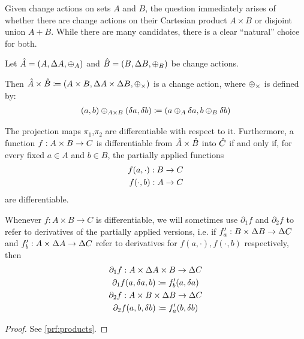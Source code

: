 Given change actions on sets $A$ and $B$, the question immediately arises of whether there are
change actions on their Cartesian product $A \times B$ or disjoint union $A + B$. While there are
many candidates, there is a clear ``natural'' choice for both.

\begin{prop}[name=Products, restate=products]
  \label{prop:products}
  Let $\hat{A} = (A,\Delta A,\oplus_A)$ and $\hat{B} =
  (B,\Delta B,\oplus_B)$ be change actions.

  Then $\hat{A} \times \hat{B} \coloneqq (A \times B,\Delta A \times \Delta B,\oplus_{\times})$ is a change action,
  where $\oplus_{\times}$ is defined by:
  \begin{align*}
    (a, b) \oplus_{A \times B} (\delta a, \delta b) \coloneqq (a \oplus_A \delta a, b \oplus_B \delta b)
  \end{align*}
  
  The projection maps $\pi_1$,$\pi_2$ are differentiable with respect to it.
  Furthermore, a function 
  $f : A \times B \rightarrow C$ is differentiable from $\hat{A} \times \hat{B}$ into $\hat{C}$ if
  and only if, for every fixed $a \in A$ and $b \in B$, the partially applied functions 
  \begin{align*}
    f(a, \cdot) : B \rightarrow C\\
    f(\cdot, b) : A \rightarrow C
  \end{align*}
  are differentiable.
\end{prop}

Whenever $f : A \times B \rightarrow C$ is differentiable, we will sometimes use $\partial_1 f$ and
$\partial_2 f$ to refer to derivatives of the partially applied versions, i.e. if
$f'_a : B \times \Delta B \rightarrow \Delta C$ and
$f'_b : A \times \Delta A \rightarrow \Delta C$ refer to derivatives for 
$f(a, \cdot), f(\cdot, b)$ respectively, then
\begin{gather*}
  \partial_1 f : A \times \Delta A \times B \rightarrow \Delta C\\
  \partial_1 f(a, \delta a, b) \coloneqq f'_b(a, \delta a)\\
  \partial_2 f : A \times B \times \Delta B \rightarrow \Delta C\\
  \partial_2 f(a, b, \delta b) \coloneqq f'_a(b, \delta b)
\end{gather*}

\ifproofs
\begin{proof}
  See \cref{prf:products}.
\end{proof}
\fi

